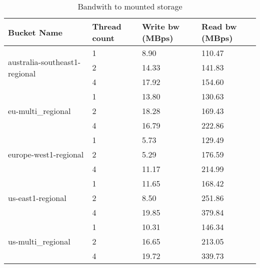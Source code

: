 \documentclass[paper=a4, fontsize=11pt]{scrartcl}
\numberwithin{equation}{section}    %
\numberwithin{figure}{section}      %
\numberwithin{table}{section}       %
\begin{document}
\begin{table}[htb]
\centering
\caption{Bandwith to mounted storage}
\begin{tabular}{|l|l|l|l|}
\hline
Bucket Name                                           & Thread count & Write bw (MBps) & Read bw (MBps) \\ \hline
\multirow{3}{*}{australia-southeast1-regional}        & 1            & 8.90           &  110.47         \\ \cline{2-4} 
                                                      & 2            & 14.33          &  141.83         \\ \cline{2-4} 
                                                      & 4            & 17.92          &  154.60         \\ \hline
\multirow{3}{*}{eu-multi\_regional}                    & 1            & 13.80          &  130.63         \\ \cline{2-4} 
                                                      & 2            & 18.28          &  169.43         \\ \cline{2-4} 
                                                      & 4            & 16.79          &  222.86         \\ \hline
\multirow{3}{*}{europe-west1-regional}                & 1            & 5.73           & 129.49         \\ \cline{2-4} 
                                                      & 2            & 5.29           & 176.59         \\ \cline{2-4} 
                                                      & 4            & 11.17           & 214.99         \\ \hline
\multirow{3}{*}{us-east1-regional}                    & 1            & 11.65           & 168.42         \\ \cline{2-4} 
                                                      & 2            & 8.50           & 251.86         \\ \cline{2-4} 
                                                      & 4            & 19.85           & 379.84         \\ \hline
\multirow{3}{*}{us-multi\_regional}                    & 1            & 10.31           & 146.34         \\ \cline{2-4} 
                                                      & 2            & 16.65           & 213.05         \\ \cline{2-4} 
                                                      & 4            & 19.72           & 339.73         \\ \hline
\end{tabular}
\end{table}
\end{document}
